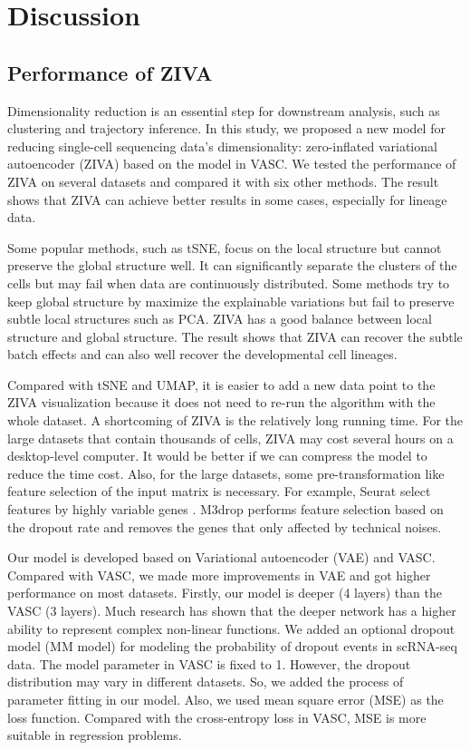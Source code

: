 \section{Discussion}
\subsection{Performance of ZIVA}
Dimensionality reduction is an essential step for downstream analysis, such as clustering and trajectory inference. In this study, we proposed a new model for reducing single-cell sequencing data's dimensionality: zero-inflated variational autoencoder (ZIVA) based on the model in VASC. We tested the performance of ZIVA on several datasets and compared it with six other methods. The result shows that ZIVA can achieve better results in some cases, especially for lineage data. 

Some popular methods, such as tSNE, focus on the local structure but cannot preserve the global structure well. It can significantly separate the clusters of the cells but may fail when data are continuously distributed. Some methods try to keep global structure by maximize the explainable variations but fail to preserve subtle local structures such as PCA. ZIVA has a good balance between local structure and global structure. The result shows that ZIVA can recover the subtle batch effects and can also well recover the developmental cell lineages.

Compared with tSNE and UMAP, it is easier to add a new data point to the ZIVA visualization because it does not need to re-run the algorithm with the whole dataset. A shortcoming of ZIVA is the relatively long running time. For the large datasets that contain thousands of cells, ZIVA may cost several hours on a desktop-level computer. It would be better if we can compress the model to reduce the time cost. Also, for the large datasets, some pre-transformation like feature selection of the input matrix is necessary. For example, Seurat select features by highly variable genes \cite{Satija2015}. M3drop \cite{andrews2019m3drop} performs feature selection based on the dropout rate and removes the genes that only affected by technical noises.

Our model is developed based on Variational autoencoder (VAE) and VASC. Compared with VASC, we made more improvements in VAE and got higher performance on most datasets. Firstly, our model is deeper (4 layers) than the VASC (3 layers). Much research has shown that the deeper network has a higher ability to represent complex non-linear functions. We added an optional dropout model (MM model) for modeling the probability of dropout events in scRNA-seq data. The model parameter in VASC is fixed to 1. However, the dropout distribution may vary in different datasets. So, we added the process of parameter fitting in our model. Also, we used mean square error (MSE) as the loss function. Compared with the cross-entropy loss in VASC, MSE is more suitable in regression problems. 

